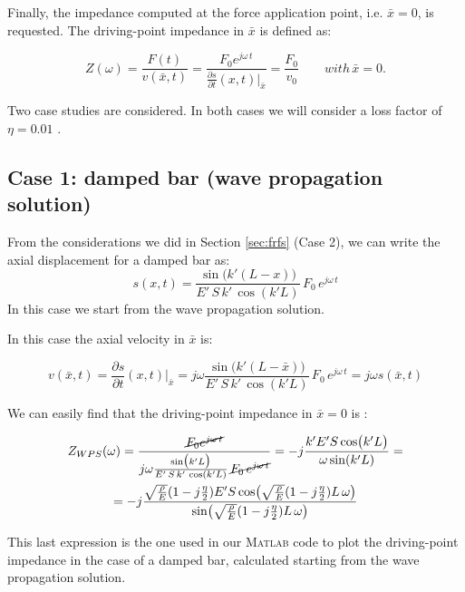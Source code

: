 \documentclass[a4paper,12pt,oneside]{article}
\begin{document}
Finally, the impedance computed at the force application point, i.e. $ \bar{x} = 0 $, is requested. The driving-point impedance in $\bar{x}$ is defined as:

\[
Z( \omega ) =
\frac{F(t)}{v(\bar{x},t)} =
\frac{F_0 e^{j \omega \, t}}{ 
	\frac{\partial s}{\partial t} (x,t) \vert_{\bar{x}}} =
\frac{F_0}{v_0}
\qquad with \, \bar{x} = 0.
\]

Two case studies are considered. In both cases we will consider a loss factor of $\eta = 0.01$ .

\subsection*{Case 1: damped bar (wave propagation solution)}

From the considerations we did in Section \ref{sec:frfs} (Case 2), we can write the axial displacement for a damped bar as:
\[
s(x,t) = 
		\frac{\sin\bigl(k'(L - x)\bigr)}{E' \, S \, k' \, \cos(k'L)} \,
		F_0 \, e^{j \omega \, t} 
\]
In this case we start from the wave propagation solution.


In this case the axial velocity in $\bar{x}$ is:

\[
v(\bar{x},t) = \frac{\partial s}{\partial t} (x,t) \vert_{\bar{x}} =
j \omega \frac{\sin\bigl(k'(L - \bar{x})\bigr)}{E' \, S \, k' \, \cos(k'L)} \,
		F_0 \, e^{j \omega \, t} = 
j \omega s(\bar{x},t)
\]

We can easily find that the driving-point impedance in $\bar{x} = 0$ is :


\begin{gather*}
Z_{WPS} (\omega ) =
	\frac{\cancel{F_0 e^{j \omega \, t}}}{
	j \omega \frac{\sin\bigl(k'L\bigr)}{E' \, S \, k' \, \cos(k'L)} 			\, \cancel{F_0 \, e^{j \omega \, t}}} =	
-j \frac{k'E'S \cos\bigl(k'L\bigr)}{\omega  \sin(k'L)} = \\ 
= -j \frac{
\sqrt{\frac{\rho}{E}} (1 - j \frac{\eta}{2}) E' S 
\cos\bigl(\sqrt{\frac{\rho}{E}} (1 - j \frac{\eta}{2}) L \, \omega \bigr)}
{\sin\bigl(\sqrt{\frac{\rho}{E}} (1 - j \frac{\eta}{2}) L \, \omega \bigr)}
\end{gather*} 

This last expression is the one used in our \textsc{Matlab} code to plot the driving-point impedance in the case of a damped bar, calculated starting from the wave propagation solution.
\end{document}
